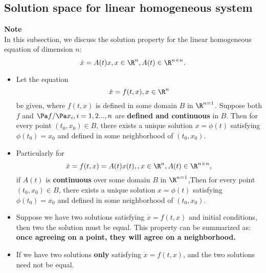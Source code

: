 \begin{refsection}
\subsection{Solution space for linear homogeneous system}
\begin{mdframed}
\textbf{Note}\\
In this subsection, we discuss the solution property for the linear homogeneous equation of dimension $n$:
$$\dot{x} = A(t)x, x\in \R^n, A(t)\in \R^{n\times n}.$$
\end{mdframed}
\begin{theorem}\cite[8]{sanchez1968ordinary}\label{ch:dynamical-systems:th:existenceUniquenessLinearHomogeneousSystems} \hfill
\begin{itemize}
	\item Let the equation $$\dot{x}=f(t,x),x\in\R^n$$ be given, where $f(t,x)$ is defined in some domain $B$ in $\R^{n=1}$. Suppose both $f$ and $\Pa f/\Pa x_i,i=1,2...,n$ are \textbf{defined and continuous} in $B$. Then for every point $(t_0,x_0)\in B$, there exists a unique solution $x=\phi(t)$ satisfying $\phi(t_0) = x_0$ and defined in some neighborhood of $(t_0,x_0)$.
	\item Particularly for $$\dot{x}=f(t,x) = A(t)x(t),, x\in \R^n, A(t)\in \R^{n\times n},$$
	if $A(t)$ is \textbf{continuous} over some domain $B$ in $\R^{n=1}$,Then for every point $(t_0,x_0)\in B$, there exists a unique solution $x=\phi(t)$ satisfying $\phi(t_0) = x_0$ and defined in some neighborhood of $(t_0,x_0)$.
\end{itemize}	
\end{theorem}


\begin{remark}[consequences]\hfill
\begin{itemize}
    \item Suppose we have two solutions satisfying $\dot{x}=f(t,x)$ and initial conditions, then two the solution must be equal. This property can be summarized as: \textbf{once agreeing on a point, they will agree on a neighborhood.}
    \item If we have two solutions \textbf{only} satisfying $\dot{x}=f(t,x)$, and the two solutions need not be equal.
\end{itemize}
\end{remark}




\end{refsection}
